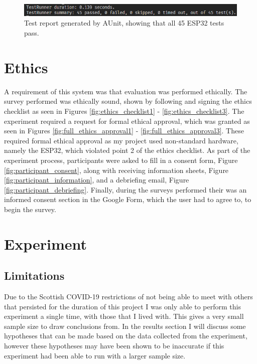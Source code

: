 \documentclass{l4proj}
\begin{document}
\begin{figure}[!htb]
    \centering
    \includegraphics[width=1.0\linewidth]{images/esp32-test-pass.png}

    \caption{ Test report generated by AUnit, showing that all 45 ESP32 tests pass. }

    \label{fig:esp32_tests_pass}
\end{figure}

\section{Ethics}

A requirement of this system was that evaluation was performed ethically. The survey performed was ethically sound, shown by following and signing the ethics checklist as seen in Figures \ref{fig:ethics_checklist1} - \ref{fig:ethics_checklist3}. The experiment required a request for formal ethical approval, which was granted as seen in Figures \ref{fig:full_ethics_approval1} - \ref{fig:full_ethics_approval3}. These required formal ethical approval as my project used non-standard hardware, namely the ESP32, which violated point 2 of the ethics checklist. As part of the experiment process, participants were asked to fill in a consent form, Figure \ref{fig:participant_consent}, along with receiving information sheets, Figure \ref{fig:participant_information},  and a debriefing email, Figure \ref{fig:participant_debriefing}. Finally, during the surveys performed their was an informed consent section in the Google Form, which the user had to agree to, to begin the survey.

\section{Experiment}

\subsection{Limitations}

Due to the Scottish COVID-19 restrictions of not being able to meet with others that persisted for the duration of this project I was only able to perform this experiment a single time, with those that I lived with. This gives a very small sample size to draw conclusions from. In the results section I will discuss some hypotheses that can be made based on the data collected from the experiment, however these hypotheses may have been shown to be inaccurate if this experiment had been able to run with a larger sample size.
\end{document}
